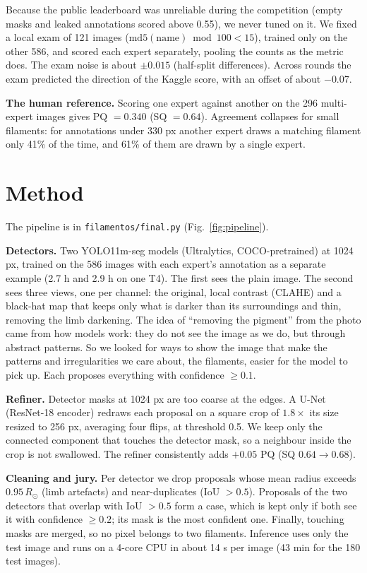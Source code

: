 \documentclass[conference]{IEEEtran}
\begin{document}
Because the public leaderboard was unreliable during the competition (empty masks and leaked annotations
scored above 0.55), we never tuned on it. We fixed a local exam of 121 images ($\mathrm{md5}(\text{name})
\bmod 100 < 15$), trained only on the other 586, and scored each expert separately, pooling the counts as the
metric does. The exam noise is about $\pm0.015$ (half-split differences). Across rounds the exam predicted
the direction of the Kaggle score, with an offset of about $-0.07$.

\textbf{The human reference.} Scoring one expert against another on the 296 multi-expert images gives
PQ $=0.340$ (SQ $=0.64$). Agreement collapses for small filaments: for annotations under 330 px another expert
draws a matching filament only 41\% of the time, and 61\% of them are drawn by a single expert.

\section{Method}
The pipeline is in \texttt{filamentos/final.py} (Fig.~\ref{fig:pipeline}).

\textbf{Detectors.} Two YOLO11m-seg models (Ultralytics, COCO-pretrained) at 1024 px, trained on the 586
images with each expert's annotation as a separate example (2.7 h and 2.9 h on one T4). The first sees the
plain image. The second sees three views, one per channel: the original, local contrast (CLAHE) and a
black-hat map that keeps only what is darker than its surroundings and thin, removing the limb darkening.
The idea of ``removing the pigment'' from the photo came from how models work: they do not see the
image as we do, but through abstract patterns. So we looked for ways to show the image that make the
patterns and irregularities we care about, the filaments, easier for the model to pick up.
Each proposes everything with confidence $\ge0.1$.

\textbf{Refiner.} Detector masks at 1024 px are too coarse at the edges. A U-Net (ResNet-18 encoder) redraws
each proposal on a square crop of $1.8\times$ its size resized to 256 px, averaging four flips, at threshold
0.5. We keep only the connected component that touches the detector mask, so a neighbour inside the crop is
not swallowed. The refiner consistently adds $+0.05$ PQ (SQ $0.64\rightarrow0.68$).

\textbf{Cleaning and jury.} Per detector we drop proposals whose mean radius exceeds $0.95\,R_\odot$ (limb
artefacts) and near-duplicates (IoU $>0.5$). Proposals of the two detectors that overlap with IoU $>0.5$
form a case, which is kept only if both see it with confidence $\ge0.2$; its mask is the most confident
one. Finally, touching masks are merged, so no pixel belongs to two filaments. Inference uses only the
test image and runs on a 4-core CPU in about 14 s per image (43 min for the 180 test images).
\end{document}
